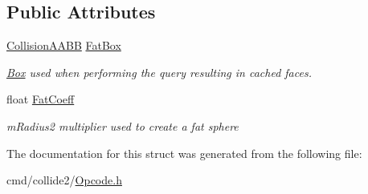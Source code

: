 \subsection*{Public Attributes}
\begin{DoxyCompactItemize}
\item 
\hyperlink{classOpcode_1_1CollisionAABB}{Collision\+A\+A\+BB} \hyperlink{structOpcode_1_1AABBCache_abbbaff7342f3f82d6a0bf0ec8a2dbe12}{Fat\+Box}\hypertarget{structOpcode_1_1AABBCache_abbbaff7342f3f82d6a0bf0ec8a2dbe12}{}\label{structOpcode_1_1AABBCache_abbbaff7342f3f82d6a0bf0ec8a2dbe12}

\begin{DoxyCompactList}\small\item\em \hyperlink{classBox}{Box} used when performing the query resulting in cached faces. \end{DoxyCompactList}\item 
float \hyperlink{structOpcode_1_1AABBCache_a277d5f9dd30242d99aef111fbe146ba8}{Fat\+Coeff}\hypertarget{structOpcode_1_1AABBCache_a277d5f9dd30242d99aef111fbe146ba8}{}\label{structOpcode_1_1AABBCache_a277d5f9dd30242d99aef111fbe146ba8}

\begin{DoxyCompactList}\small\item\em m\+Radius2 multiplier used to create a fat sphere \end{DoxyCompactList}\end{DoxyCompactItemize}


The documentation for this struct was generated from the following file\+:\begin{DoxyCompactItemize}
\item 
cmd/collide2/\hyperlink{Opcode_8h}{Opcode.\+h}\end{DoxyCompactItemize}
